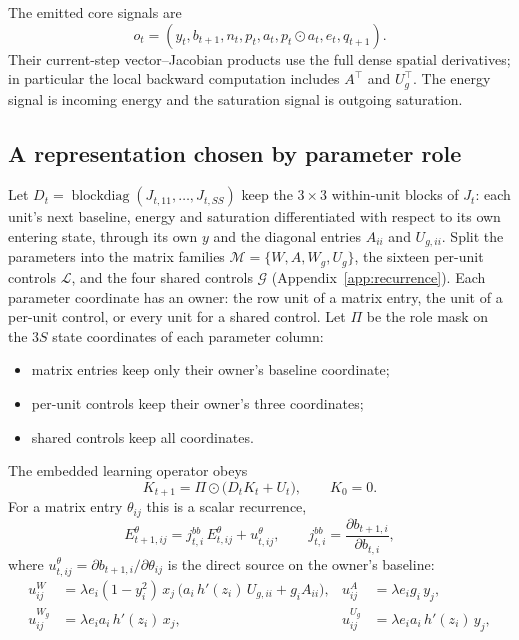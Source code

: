 \documentclass[11pt]{article}
\theoremstyle{definition}
\newcommand{\bdiag}{\operatorname{blockdiag}}
\newcommand{\Had}{\odot}
\begin{document}
The emitted core signals are
\begin{equation}
 o_t=(y_t,b_{t+1},n_t,p_t,a_t,p_t\Had a_t,e_t,q_{t+1}).
 \label{eq:signals}
\end{equation}
Their current-step vector--Jacobian products use the full dense spatial
derivatives; in particular the local backward computation includes $A^\top$ and
$U_g^\top$. The energy signal is incoming energy and the saturation signal is
outgoing saturation.

\subsection{A representation chosen by parameter role}
\label{sec:projection}

Let $D_t=\bdiag(J_{t,11},\ldots,J_{t,SS})$ keep the $3\times3$ within-unit blocks
of $J_t$: each unit's next baseline, energy and saturation differentiated with
respect to its own entering state, through its own $y$ and the diagonal entries
$A_{ii}$ and $U_{g,ii}$. Split the parameters into the matrix families
$\mathcal M=\{W,A,W_g,U_g\}$, the sixteen per-unit controls $\mathcal L$, and the
four shared controls $\mathcal G$ (Appendix~\ref{app:recurrence}). Each parameter
coordinate has an owner: the row unit of a matrix entry, the unit of a per-unit
control, or every unit for a shared control. Let $\Pi$ be the role mask on the
$3S$ state coordinates of each parameter column:
\begin{itemize}
 \item matrix entries keep only their owner's baseline coordinate;
 \item per-unit controls keep their owner's three coordinates;
 \item shared controls keep all coordinates.
\end{itemize}
The embedded learning operator obeys
\begin{equation}
 \boxed{K_{t+1}=\Pi\Had\big(D_tK_t+U_t\big),\qquad K_0=0.}
 \label{eq:online}
\end{equation}
For a matrix entry $\theta_{ij}$ this is a scalar recurrence,
\begin{equation}
 E^{\theta}_{t+1,ij}=j^{bb}_{t,i}\,E^{\theta}_{t,ij}+u^{\theta}_{t,ij},\qquad
 j^{bb}_{t,i}=\frac{\partial b_{t+1,i}}{\partial b_{t,i}},
 \label{eq:matrix-trace}
\end{equation}
where $u^\theta_{t,ij}=\partial b_{t+1,i}/\partial\theta_{ij}$ is the direct source
on the owner's baseline:
\begin{align}
 u^{W}_{ij}&=\lambda e_i(1-y_i^2)\,x_j\,\big(a_i\,h'(z_i)\,U_{g,ii}+g_iA_{ii}\big), &
 u^{A}_{ij}&=\lambda e_ig_i\,y_j,\\
 u^{W_g}_{ij}&=\lambda e_ia_i\,h'(z_i)\,x_j, &
 u^{U_g}_{ij}&=\lambda e_ia_i\,h'(z_i)\,y_j,
 \label{eq:sources}
\end{align}
\end{document}
